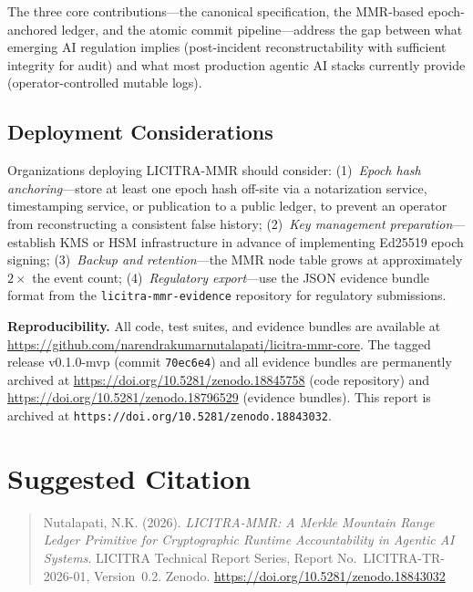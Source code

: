 \documentclass{article}
\begin{document}
The three core contributions---the canonical specification, the MMR-based
epoch-anchored ledger, and the atomic commit pipeline---address the gap between
what emerging AI regulation implies (post-incident reconstructability with
sufficient integrity for audit) and what most production agentic AI stacks
currently provide (operator-controlled mutable logs).

\subsection{Deployment Considerations}

Organizations deploying LICITRA-MMR should consider:
(1)~\textit{Epoch hash anchoring}---store at least one epoch hash off-site via a
notarization service, timestamping service, or publication to a public ledger,
to prevent an operator from reconstructing a consistent false history;
(2)~\textit{Key management preparation}---establish KMS or HSM infrastructure in
advance of implementing Ed25519 epoch signing;
(3)~\textit{Backup and retention}---the MMR node table grows at approximately
$2\times$ the event count;
(4)~\textit{Regulatory export}---use the JSON evidence bundle format from the
\texttt{licitra-mmr-evidence} repository for regulatory submissions.

\bigskip
\noindent\textbf{Reproducibility.} All code, test suites, and evidence bundles
are available at
\url{https://github.com/narendrakumarnutalapati/licitra-mmr-core}. The tagged
release v0.1.0-mvp (commit \texttt{70ec6e4}) and all evidence bundles are
permanently archived at \url{https://doi.org/10.5281/zenodo.18845758} (code
repository) and \url{https://doi.org/10.5281/zenodo.18796529} (evidence bundles). This report is archived at \texttt{https://doi.org/10.5281/zenodo.18843032}.

\section*{Suggested Citation}

\begin{quote}
\small
Nutalapati, N.K. (2026). \emph{LICITRA-MMR: A Merkle Mountain Range Ledger Primitive for
Cryptographic Runtime Accountability in Agentic AI Systems}. LICITRA Technical Report Series,
Report No.\ LICITRA-TR-2026-01, Version~0.2.
Zenodo. \url{https://doi.org/10.5281/zenodo.18843032}
\end{quote}
\end{document}
